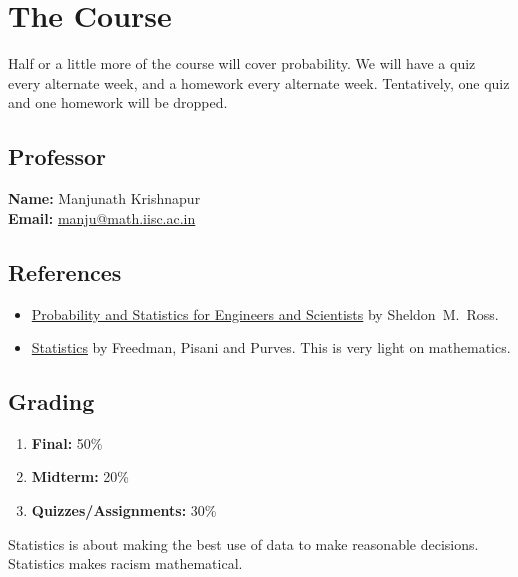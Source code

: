 
\section{The Course} \label{sec:intro}
Half or a little more of the course will cover probability.
We will have a quiz every alternate week, and a homework every alternate week.
Tentatively, one quiz and one homework will be dropped.

\subsection{Professor} \label{sec:professor}
\textbf{Name:} Manjunath Krishnapur \\
\textbf{Email:} \href{mailto:manju@math.iisc.ac.in}{manju@math.iisc.ac.in}

\subsection{References} \label{sec:references}
\begin{itemize}
    \item \href{https://minerva.it.manchester.ac.uk/~saralees/statbook3.pdf}
        {Probability and Statistics for Engineers and Scientists} by
        Sheldon~M.~Ross.
    \item \href{http://staff.ustc.edu.cn/~ynyang/2022/books/2.5.pdf}{Statistics}
        by Freedman, Pisani and Purves.
        This is very light on mathematics.
\end{itemize}
\subsection{Grading} \label{sec:grading}
\begin{enumerate}
    \item \textbf{Final:} 50\%
    \item \textbf{Midterm:} 20\%
    \item \textbf{Quizzes/Assignments:} 30\%
\end{enumerate}

Statistics is about making the best use of data to make reasonable decisions.
Statistics makes racism mathematical.


